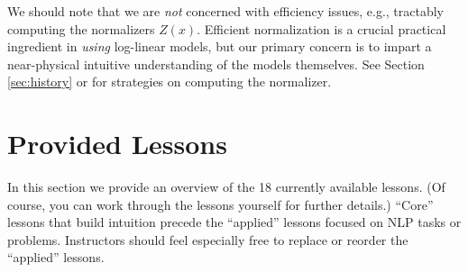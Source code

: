 \documentclass[11pt,letterpaper]{article}
\newcommand{\Note}[1]{}
\newcommand{\NoteSigned}[3]{{\sethlcolor{#2}\Note{#1: #3}}}
\newcommand{\NoteFF}[1]{\NoteSigned{FF}{LightBlue}{#1}}
\newcommand{\NumLessons}[0]{18}%
\begin{document}



We should note that we are \textit{not} concerned with efficiency issues, e.g.,  
tractably computing the normalizers $Z(x)$. Efficient normalization
is a crucial practical ingredient in {\em using} log-linear models,
but our primary concern is to impart a near-physical intuitive
understanding of the models themselves. See Section \ref{sec:history}
or  for strategies on computing the normalizer.



\section{Provided Lessons}\label{sec:lessons}
In this section we provide an overview of the \NumLessons{} currently
available lessons.  (Of course, you can work through the lessons
yourself for further details.)  ``Core'' lessons that build intuition
precede the ``applied'' lessons focused on NLP tasks or problems.
Instructors should feel especially free to replace or reorder the
``applied'' lessons.
\end{document}

